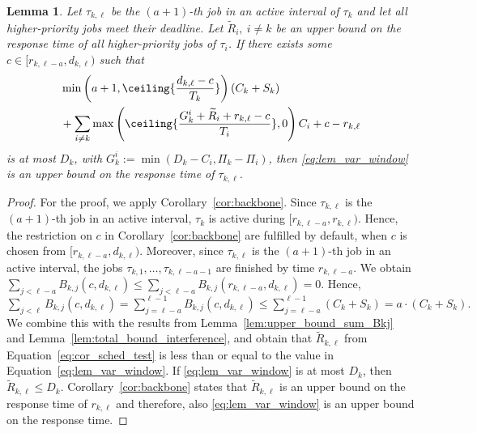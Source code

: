 \documentclass[conference]{IEEEtran}
\newtheorem{lem}[thm]{Lemma}
\theoremstyle{definition}
\theoremstyle{remark}
\newcommand{\Rtilde}{\widetilde{R}}
\begin{document}
	\begin{lem}\label{lem:suff_sched_test_var_prep}
		Let $\tau_{k,\ell}$ be the $(a+1)$-th job in an active interval of $\tau_k$ and let all higher-priority jobs meet their deadline.
		Let $\Rtilde_i,~i\neq k$ be an upper bound on the response time of all higher-priority jobs of $\tau_i$.
		If there exists some $c \in [r_{k,\ell-a},d_{k,\ell})$ such that 
		\begin{equation}\label{eq:lem_var_window}
			\begin{aligned}
				&\min \left( a+1, \ceiling{\frac{d_{k,\ell}-c}{T_k}} \right) (C_k+S_k)
				\\&+ \sum_{i \neq k} \max\left( \ceiling{\frac{G^i_k+\Rtilde_i+r_{k,\ell}-c}{T_i}}, 0 \right) C_i
				+ c - r_{k,\ell}
			\end{aligned}
		\end{equation}
		is at most $D_k$,
		with $G^i_k := \min(D_k-C_i, \Pi_k-\Pi_i)$, then \eqref{eq:lem_var_window} is an upper bound on the response time of $\tau_{k,\ell}$.
	\end{lem}
	\begin{proof}
		For the proof, we apply Corollary~\ref{cor:backbone}.
		Since $\tau_{k,\ell}$ is the $(a+1)$-th job in an active interval, $\tau_k$ is active during $[r_{k,\ell-a}, r_{k,\ell})$.
		Hence, the restriction on $c$ in Corollary~\ref{cor:backbone} are fulfilled by default, when $c$ is chosen from $[r_{k,\ell-a}, d_{k,\ell})$.
		Moreover, since $\tau_{k,\ell}$ is the $(a+1)$-th job in an active interval, the jobs $\tau_{k,1}, \dots, \tau_{k,\ell-a-1}$ are finished by time $r_{k,\ell-a}$.
		We obtain $\sum_{j < \ell-a} B_{k,j} (c,d_{k,\ell}) \leq \sum_{j < \ell-a} B_{k,j} (r_{k,\ell-a},d_{k,\ell}) = 0$.
		Hence, 
		$
			\sum_{j < \ell} B_{k,j} (c,d_{k,\ell}) 
			= \sum_{j = \ell-a}^{\ell-1} B_{k,j} (c,d_{k,\ell})
			\leq \sum_{j = \ell-a}^{\ell-1} (C_k+S_k)
			= a\cdot (C_k+S_k).
		$
		We combine this with the results from Lemma~\ref{lem:upper_bound_sum_Bkj} and Lemma~\ref{lem:total_bound_interference}, and obtain that $\Rtilde_{k,\ell}$ from Equation~\eqref{eq:cor_sched_test} is less than or equal to the value in Equation~\eqref{eq:lem_var_window}.
		If \eqref{eq:lem_var_window} is at most $D_k$, then $\Rtilde_{k,\ell}\leq D_k$.
		Corollary~\ref{cor:backbone} states that $\Rtilde_{k,\ell}$ is an upper bound on the response time of $r_{k,\ell}$ and therefore, also \eqref{eq:lem_var_window} is an upper bound on the response time.
	\end{proof}
	
\end{document}
